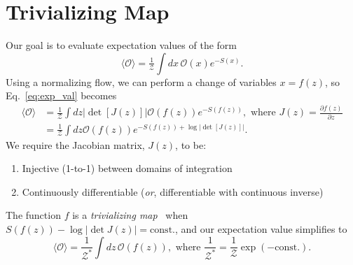 \documentclass[a4paper,11pt]{article}
\begin{document}
\section{\label{sec:trivializing_map}Trivializing Map}
%
Our goal is to evaluate expectation values of the form
%
\begin{equation}
    \label{eq:exp_val}
    \langle \mathcal{O} \rangle = \tfrac{1}{\mathcal{Z}} \int dx\, \mathcal{O} (x) e^{-S(x)}.
\end{equation}
%
Using a normalizing flow, we can perform a change of variables \(x = f(z)\), so
Eq.~\ref{eq:exp_val} becomes
%
\begin{align}
    \langle \mathcal{O} \rangle 
    &= \frac{1}{\mathcal{Z}} \int dz \left|\det \left[ J(z) \right]\right|
        \mathcal{O} (f(z)) e^{-S(f(z))},
        \text{ where } J (z) = \frac{\partial f(z)}{\partial z} \\
    &= \frac{1}{\mathcal{Z}}\int dz \mathcal{O} (f(z)) e^{-S(f(z))
        + \log |\det[J(z)]|}.
\end{align}
%
We require the Jacobian matrix, \(J(z)\), to be:
%
\begin{enumerate}
    \item Injective (1-to-1) between domains of integration
    \item Continuously differentiable (\emph{or}, differentiable with
        continuous inverse)
\end{enumerate}
%
The function \(f\) is a \emph{trivializing map}~\cite{luscher2009} when
\(S(f(z)) - \log\left|\det J(z)\right| = \text{const.}\), and our expectation
value simplifies to
%
\begin{equation}
    \langle\mathcal{O}\rangle = 
    \frac{1}{\mathcal{Z}^{\ast}}\int dz\, \mathcal{O}(f(z)), \text{ where }
    \frac{1}{\mathcal{Z}^{\ast}} 
    = \frac{1}{\mathcal{Z}}\exp(-\text{const.}).
\end{equation}
%
\end{document}
